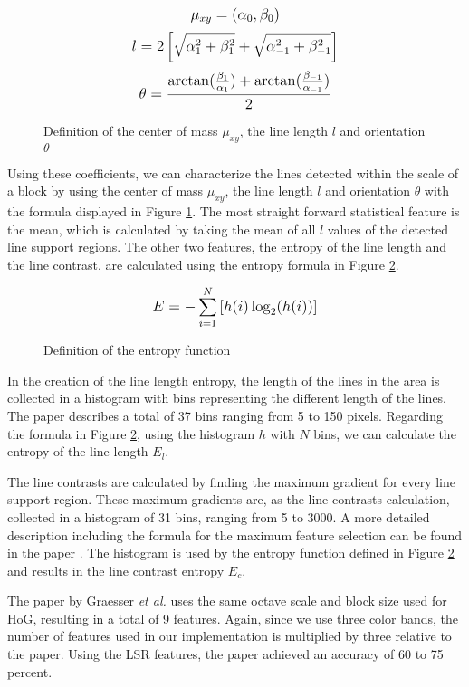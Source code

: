 \begin{figure}[h]
	\centering
	$$\mathlarger{\mu_{xy} = (\alpha_{0}, \beta_{0})}$$
	$$\mathlarger{l = 2\left[\sqrt{\alpha_{1}^2 + \beta_{1}^2} + \sqrt{\alpha_{-1}^2 + \beta_{-1}^2}\right]}$$
	$$\mathlarger{\theta = \frac{\arctan(\frac{\beta_{1}}{\alpha_{1}}) + \arctan(\frac{\beta_{-1}}{\alpha_{-1}})}{2}}$$
	\caption{Definition of the center of mass $\mu_{xy}$, the line length $l$ and orientation $\theta$}
	\label{line_def}
\end{figure}

Using these coefficients, we can characterize the lines detected within the scale of a block by using the center of mass $\mu_{xy}$, the line length $l$ and orientation $\theta$ with the formula displayed in Figure \ref{line_def}. The most straight forward statistical feature is the mean, which is calculated by taking the mean of all $l$ values of the detected line support regions. The other two features, the entropy of the line length and the line contrast,  are calculated using the entropy formula in Figure \ref{line_entropy_def}. 

\begin{figure}[h]
	
	$$ \mathlarger{E = -\sum_{i=1}^{N} \left[ h(i) \log_2(h(i))\right]}$$
	\caption{Definition of the entropy function}
	\label{line_entropy_def}
\end{figure}

In the creation of the line length entropy, the length of the lines in the area is collected in a histogram with bins representing the different length of the lines. The paper\cite{unsalan2004classifying} describes a total of 37 bins ranging from 5 to 150 pixels. Regarding the formula in Figure \ref{line_entropy_def}, using the histogram $h$ with $N$ bins, we can calculate the entropy of the line length $E_l$.

The line contrasts are calculated by finding the maximum gradient for every line support region. These maximum gradients are, as the line contrasts calculation, collected in a histogram of 31 bins, ranging from 5 to 3000. A more detailed description including the formula for the maximum feature selection can be found in the paper \cite{unsalan2004classifying}. The histogram is used by the entropy function defined in Figure \ref{line_entropy_def} and results in the line contrast entropy $E_c$.

The paper by Graesser \textit{et al.} uses the same octave scale and block size used for HoG, resulting in a total of 9 features. Again, since we use three color bands, the number of features used in our implementation is multiplied by three relative to the paper. Using the LSR features, the paper achieved an accuracy of 60 to 75 percent.



